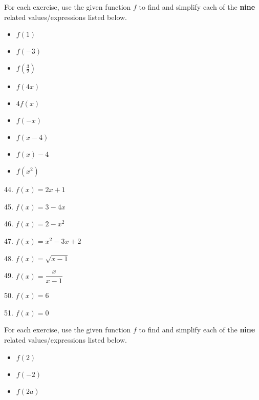 \documentclass[12pt]{book}
\theoremstyle{definition}
\begin{document}
For each exercise, use the given function $f$ to find and simplify each of the {\bf nine} related values/expressions listed below.

\begin{multicols}{3}
\begin{itemize}
\item $f(1)$
\item $f(-3)$
\item $f\left(\frac{3}{2} \right)$
\end{itemize}
\end{multicols}

\begin{multicols}{3}
\begin{itemize}
\item $f(4x)$
\item $4f(x)$
\item $f(-x)$
\end{itemize}
\end{multicols}

\begin{multicols}{3}
\begin{itemize}
\item  $f(x-4)$
\item $f(x) - 4$
\item  $f\left(x^2\right)$
\end{itemize}
\end{multicols}

\begin{enumerate}
\begin{multicols}{2}
\item[44.]  $f(x) = 2x+1$
\item[45.]  $f(x) = 3 - 4x$
\item[46.] $f(x) = 2 - x^2$
\item[47.] $f(x) = x^2 - 3x + 2$
\item[48.] $f(x) = \sqrt{x-1}$
\item[49.] $f(x) = \dfrac{x}{x-1}$
\item[50.] $f(x) = 6$
\item[51.] $f(x) = 0$
\end{multicols}
\end{enumerate}

For each exercise, use the given function $f$ to find and simplify each of the {\bf nine} related values/expressions listed below.

\begin{multicols}{3}
\begin{itemize}
\item  $f(2)$
\item  $f(-2)$
\item  $f(2a)$
\end{itemize}
\end{multicols}
\end{document}
